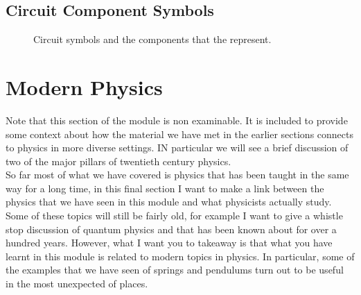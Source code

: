 \documentclass[a4paper,12pt]{book}
\begin{document}
\section{Circuit Component Symbols}
\begin{figure}[ht]
    \centering
    \caption{Circuit symbols and the components that the represent.}
    \label{fig: circuit components}
\end{figure}


\chapter{Modern Physics}
Note that this section of the module is non examinable. It is included to provide some context about how the material we have met in the earlier sections connects to physics in more diverse settings. IN particular we will see a brief discussion of two of the major pillars of twentieth century physics.\\

So far most of what we have covered is physics that has been taught in the same way for a long time, in this final section I want to make a link between the physics that we have seen in this module and what physicists actually study. Some of these topics will still be fairly old, for example I want to give a whistle stop discussion of quantum physics and that has been known about for over a hundred years. However, what I want you to takeaway is that what you have learnt in this module is related to modern topics in physics. In particular, some of the examples that we have seen of springs and pendulums turn out to be useful in the most unexpected of places.\\
\end{document}
